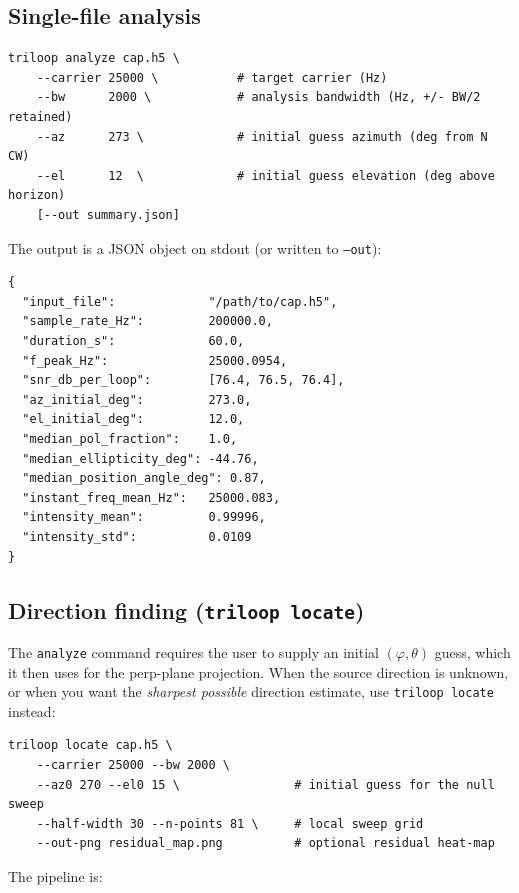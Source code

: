 \documentclass[11pt]{article}
\begin{document}
\subsection{Single-file analysis}

\begin{lstlisting}[style=shell]
triloop analyze cap.h5 \
    --carrier 25000 \           # target carrier (Hz)
    --bw      2000 \            # analysis bandwidth (Hz, +/- BW/2 retained)
    --az      273 \             # initial guess azimuth (deg from N CW)
    --el      12  \             # initial guess elevation (deg above horizon)
    [--out summary.json]
\end{lstlisting}

The output is a JSON object on stdout (or written to \texttt{--out}):

\begin{lstlisting}[style=py]
{
  "input_file":             "/path/to/cap.h5",
  "sample_rate_Hz":         200000.0,
  "duration_s":             60.0,
  "f_peak_Hz":              25000.0954,
  "snr_db_per_loop":        [76.4, 76.5, 76.4],
  "az_initial_deg":         273.0,
  "el_initial_deg":         12.0,
  "median_pol_fraction":    1.0,
  "median_ellipticity_deg": -44.76,
  "median_position_angle_deg": 0.87,
  "instant_freq_mean_Hz":   25000.083,
  "intensity_mean":         0.99996,
  "intensity_std":          0.0109
}
\end{lstlisting}

\subsection{Direction finding (\texttt{triloop locate})}
\label{sec:locate}

The \texttt{analyze} command requires the user to supply an initial
$(\varphi, \theta)$ guess, which it then uses for the perp-plane
projection.  When the source direction is unknown, or when you want
the \emph{sharpest possible} direction estimate, use
\texttt{triloop locate} instead:

\begin{lstlisting}[style=shell]
triloop locate cap.h5 \
    --carrier 25000 --bw 2000 \
    --az0 270 --el0 15 \                # initial guess for the null sweep
    --half-width 30 --n-points 81 \     # local sweep grid
    --out-png residual_map.png          # optional residual heat-map
\end{lstlisting}

The pipeline is:
\end{document}
